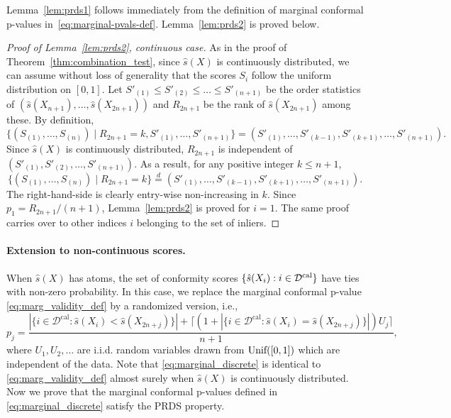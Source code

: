 \documentclass[11pt]{article}
\newcommand{\Unif}{\textnormal{Unif}}
\newcommand{\Dcal}{\mathcal{D}^\textnormal{cal}}
\begin{document}
Lemma~\ref{lem:prds1} follows immediately from the definition of marginal conformal p-values in~\eqref{eq:marginal-pvals-def}. Lemma~\ref{lem:prds2} is proved below.

\begin{proof}[Proof of Lemma~\ref{lem:prds2}, continuous case]
As in the proof of Theorem~\ref{thm:combination_test}, since $\hat{s}(X)$ is continuously distributed, we can assume without loss of generality that the scores $S_i$ follow the uniform distribution on $[0,1]$. Let $S'_{(1)} \le S'_{(2)}\le \ldots \le S'_{(n+1)}$ be the order statistics of $(\hat{s}(X_{n+1}), \ldots, \hat{s}(X_{2n+1}))$ and $R_{2n+1}$ be the rank of $\hat{s}(X_{2n+1})$ among these. By definition,
\[\bigg\{(S_{(1)}, \ldots, S_{(n)})\mid R_{2n+1} = k, S'_{(1)}, \ldots, S'_{(n+1)}\bigg\} = (S'_{(1)}, \ldots, S'_{(k-1)}, S'_{(k+1)}, \ldots, S'_{(n+1)}).\]
Since $\hat{s}
(X)$ is continuously distributed, $R_{2n+1}$ is independent of $(S'_{(1)}, S'_{(2)}, \ldots, S'_{(n+1)})$. As a result, for any positive integer $k \le n + 1$,
\[\bigg\{(S_{(1)}, \ldots, S_{(n)})\mid R_{2n+1} = k\bigg\}\stackrel{d}{=}(S'_{(1)}, \ldots, S'_{(k-1)}, S'_{(k+1)}, \ldots, S'_{(n+1)}).\]
The right-hand-side is clearly entry-wise non-increasing in $k$. Since $p_1 = R_{2n+1} / (n + 1)$, Lemma~\ref{lem:prds2} is proved for $i = 1$. The same proof carries over to other indices $i$ belonging to the set of inliers.

\end{proof}


\paragraph{Extension to non-continuous scores.} When $\hat{s}(X)$ has atoms, the set of conformity scores $\{\hat{s}(X_i): i\in \Dcal\}$ have ties with non-zero probability. In this case, we replace the marginal conformal p-value \eqref{eq:marg_validity_def} by a randomized version, i.e., 
\begin{equation}\label{eq:marginal_discrete}
p_j = \frac{|\{i \in \mathcal{D}^{\text{cal}} : \hat{s}(X_i) < \hat{s}(X_{2n+j})\}| + \lceil (1 + |\{i \in \mathcal{D}^{\text{cal}} : \hat{s}(X_i) = \hat{s}(X_{2n+j})\}|)U_j\rceil}{n+1},
\end{equation}
where $U_1, U_2, \ldots$ are i.i.d. random variables drawn from $\Unif([0, 1])$ which are independent of the data. Note that  \eqref{eq:marginal_discrete} is identical to \eqref{eq:marg_validity_def} almost surely when $\hat{s}(X)$ is continuously distributed. Now we prove that the marginal conformal p-values defined in \eqref{eq:marginal_discrete} satisfy the PRDS property. 
\end{document}
